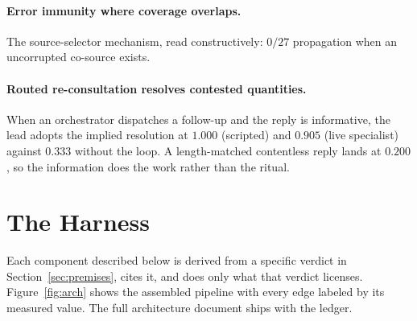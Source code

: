 \documentclass[11pt]{article}
\begin{document}
\paragraph{Error immunity where coverage overlaps.} The
source-selector mechanism, read constructively: $0/27$ propagation when
an uncorrupted co-source exists.

\paragraph{Routed re-consultation resolves contested quantities.} When
an orchestrator dispatches a follow-up and the reply is informative,
the lead adopts the implied resolution at $1.000$ (scripted) and
$0.905$ (live specialist) against $0.333$ without the loop. A
length-matched contentless reply lands at $0.200$, so the information
does the work rather than the ritual.

\section{The Harness}
\label{sec:harness}

Each component described below is derived from a specific verdict in
Section~\ref{sec:premises}, cites it, and does only what that verdict
licenses. Figure~\ref{fig:arch} shows the assembled pipeline with every
edge labeled by its measured value. The full architecture document
ships with the ledger.
\end{document}
